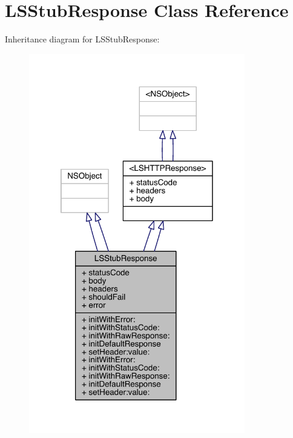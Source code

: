 \hypertarget{interface_l_s_stub_response}{\section{L\-S\-Stub\-Response Class Reference}
\label{interface_l_s_stub_response}
}


Inheritance diagram for L\-S\-Stub\-Response\-:\nopagebreak
\begin{figure}[H]
\begin{center}
\leavevmode
\includegraphics[width=267pt]{interface_l_s_stub_response__inherit__graph}
\end{center}
\end{figure}


